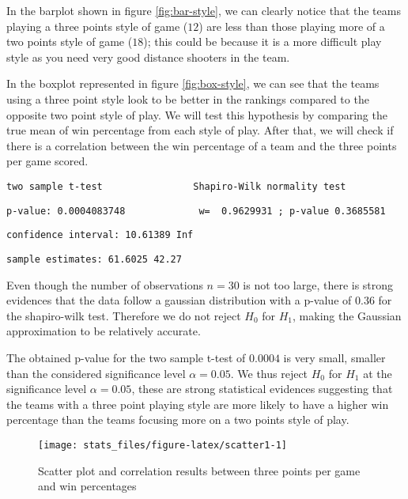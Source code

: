 \documentclass[
  12pt,
]{article}
\begin{document}
In the barplot shown in figure \ref{fig:bar-style}, we can clearly notice that the teams playing a three points style of game (\(12\)) are less than those playing more of a two points style of game (\(18\)); this could be because it is a more difficult play style as you need very good distance shooters in the team.

In the boxplot represented in figure \ref{fig:box-style}, we can see that the teams using a three point style look to be better in the rankings compared to the opposite two point style of play. We will test this hypothesis by comparing the true mean of win percentage from each style of play. After that, we will check if there is a correlation between the win percentage of a team and the three points per game scored.

\begin{verbatim}
two sample t-test                Shapiro-Wilk normality test
\end{verbatim}

\begin{verbatim}
p-value: 0.0004083748             w=  0.9629931 ; p-value 0.3685581
\end{verbatim}

\begin{verbatim}
confidence interval: 10.61389 Inf
\end{verbatim}

\begin{verbatim}
sample estimates: 61.6025 42.27
\end{verbatim}

Even though the number of observations \(n=30\) is not too large, there is strong evidences that the data follow a gaussian distribution with a p-value of \(0.36\) for the shapiro-wilk test. Therefore we do not reject \(H_{0}\) for \(H_{1}\), making the Gaussian approximation to be relatively accurate.

The obtained p-value for the two sample t-test of \(0.0004\) is very small, smaller than the considered significance level \(\alpha=0.05\). We thus reject \(H_{0}\) for \(H_{1}\) at the significance level \(\alpha=0.05\), these are strong statistical evidences suggesting that the teams with a three point playing style are more likely to have a higher win percentage than the teams focusing more on a two points style of play.

\begin{figure}

{\centering \texttt{[image: stats\_files/figure-latex/scatter1-1]} 

}

\caption{Scatter plot and correlation results between three points per game and win percentages}\label{fig:scatter1}
\end{figure}
\end{document}
